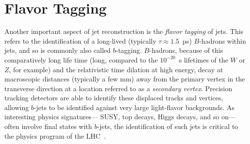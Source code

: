 


\section{Flavor Tagging}
\label{jet-reconstruction:b-tagging}

Another important aspect of jet reconstruction is the \textit{flavor tagging} of jets.  This refers to the identification of a long-lived (typically $\tau \approx 1.5$~ps) $B$-hadrons within jets, and so is commonly also called $b$-tagging. $B$-hadrons, because of this comparatively long life time (long, compared to the $10^{-20}$~s lifetimes of the $W$ or $Z$, for example) and the relativistic time dilation at high energy, decay at macroscopic distances (typically a few mm) away from the primary vertex in the transverse direction at a location referred to as a \textit{secondary vertex}. Precision tracking detectors are able to identify these displaced tracks and vertices, allowing $b$-jets to be identified against very large light-flavor backgrounds. As interesting physics signatures--- SUSY, top decays, Higgs decays, and so on--- often involve final states with $b$-jets, the identification of such jets is critical to the physics program of the LHC~\cite{ATLAS-B}.

